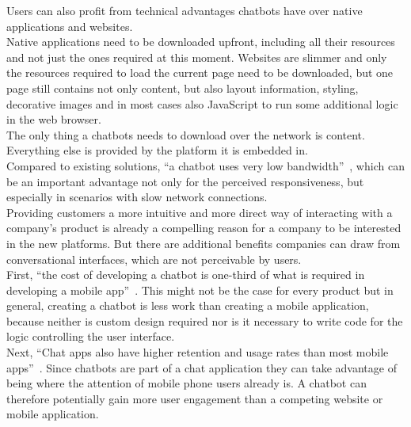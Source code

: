 Users can also profit from technical advantages chatbots have over native applications and websites.
\\
Native applications need to be downloaded upfront, including all their resources and not just the ones required at this moment.
Websites are slimmer and only the resources required to load the current page need to be downloaded,
but one page still contains not only content, but also layout information, styling, decorative images and in most cases also JavaScript to run some additional logic in the web browser.
\\
The only thing a chatbots needs to download over the network is content.
Everything else is provided by the platform it is embedded in.
\\
Compared to existing solutions, ``a chatbot uses very low bandwidth''~\cite{techinasia}, which can be an important advantage not only for the perceived responsiveness, but especially in scenarios with slow network connections.
\\

Providing customers a more intuitive and more direct way of interacting with a company's product is already a compelling reason for a company to be interested in the new platforms. But there are additional benefits companies can draw from conversational interfaces, which are not perceivable by users.
\\

First, ``the cost of developing a chatbot is one-third of what is required in developing a mobile app''~\cite{techinasia}.
This might not be the case for every product but in general, creating a chatbot is less work than creating a mobile application, because neither is custom design required nor is it necessary to write code for the logic controlling the user interface.
\\

Next, ``Chat apps also have higher retention and usage rates than most mobile apps''~\cite{businessinsider}.
Since chatbots are part of a chat application they can take advantage of being where the attention of mobile phone users already is.
A chatbot can therefore potentially gain more user engagement than a competing website or mobile application.
\\

